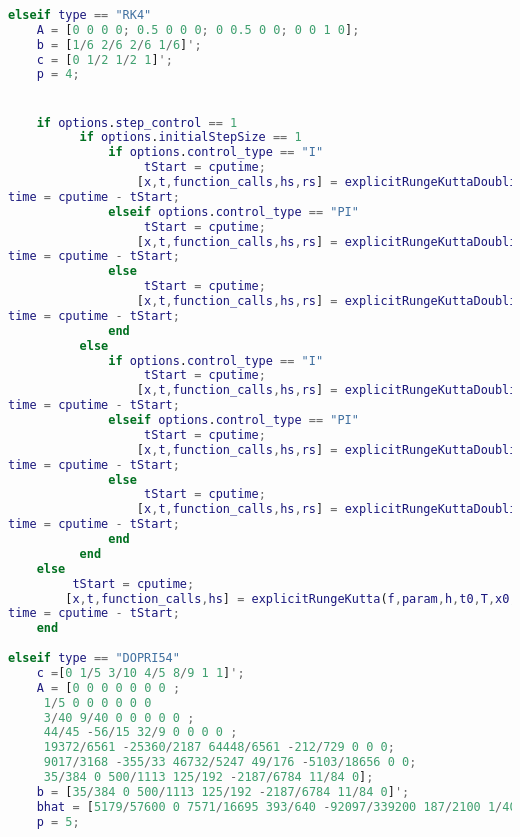 \begin{lstlisting}[language=Matlab,caption=ODEsolver wrapper,label=lst0:wrapper]
    
elseif type == "RK4"
    A = [0 0 0 0; 0.5 0 0 0; 0 0.5 0 0; 0 0 1 0];
    b = [1/6 2/6 2/6 1/6]';
    c = [0 1/2 1/2 1]';
    p = 4;


    if options.step_control == 1 
          if options.initialStepSize == 1
              if options.control_type == "I"
                   tStart = cputime;
                  [x,t,function_calls,hs,rs] = explicitRungeKuttaDoubling(f,param,h,t0,T,x0,A,b,c,Atol,Rtol,hmin,hmax,eps_tol,p,true); % euler with everything
time = cputime - tStart;
              elseif options.control_type == "PI"
                   tStart = cputime;
                  [x,t,function_calls,hs,rs] = explicitRungeKuttaDoublingPI(f,param,h,t0,T,x0,A,b,c,Atol,Rtol,hmin,hmax,eps_tol,p,true); % euler with everything
time = cputime - tStart;
              else
                   tStart = cputime;
                  [x,t,function_calls,hs,rs] = explicitRungeKuttaDoublingPID(f,param,h,t0,T,x0,A,b,c,Atol,Rtol,hmin,hmax,eps_tol,p,true); % euler with everything
time = cputime - tStart;
              end
          else
              if options.control_type == "I"
                   tStart = cputime;
                  [x,t,function_calls,hs,rs] = explicitRungeKuttaDoubling(f,param,h,t0,T,x0,A,b,c,Atol,Rtol,hmin,hmax,eps_tol,p,false); % euler with everything
time = cputime - tStart;
              elseif options.control_type == "PI"
                   tStart = cputime;
                  [x,t,function_calls,hs,rs] = explicitRungeKuttaDoublingPI(f,param,h,t0,T,x0,A,b,c,Atol,Rtol,hmin,hmax,eps_tol,p,false); % euler with everything
time = cputime - tStart;
              else
                   tStart = cputime;
                  [x,t,function_calls,hs,rs] = explicitRungeKuttaDoublingPID(f,param,h,t0,T,x0,A,b,c,Atol,Rtol,hmin,hmax,eps_tol,p,false); % euler with everything
time = cputime - tStart;
              end
          end
    else
         tStart = cputime;
        [x,t,function_calls,hs] = explicitRungeKutta(f,param,h,t0,T,x0,A,b,c); % Standard euler
time = cputime - tStart;
    end
    
elseif type == "DOPRI54"
    c =[0 1/5 3/10 4/5 8/9 1 1]';
    A = [0 0 0 0 0 0 0 ;
     1/5 0 0 0 0 0 0
     3/40 9/40 0 0 0 0 0 ;
     44/45 -56/15 32/9 0 0 0 0 ;
     19372/6561 -25360/2187 64448/6561 -212/729 0 0 0;
     9017/3168 -355/33 46732/5247 49/176 -5103/18656 0 0;
     35/384 0 500/1113 125/192 -2187/6784 11/84 0];
    b = [35/384 0 500/1113 125/192 -2187/6784 11/84 0]';
    bhat = [5179/57600 0 7571/16695 393/640 -92097/339200 187/2100 1/40]';
    p = 5;
    


\end{lstlisting}
